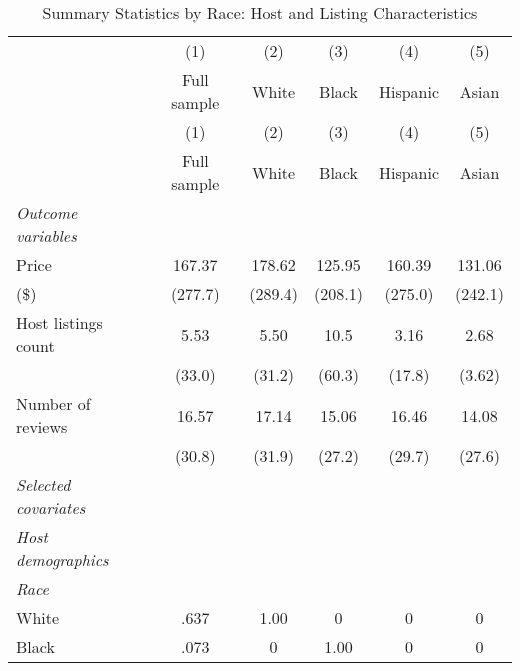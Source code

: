 {
\def\sym#1{\ifmmode^{#1}\else\(^{#1}\)\fi}
\begin{longtable}{l*{5}{c}}
\caption{Summary Statistics by Race: Host and Listing Characteristics}\\
\hline
                    &\multicolumn{1}{c}{(1)}&\multicolumn{1}{c}{(2)}&\multicolumn{1}{c}{(3)}&\multicolumn{1}{c}{(4)}&\multicolumn{1}{c}{(5)}\\
                    &\multicolumn{1}{c}{Full sample}&\multicolumn{1}{c}{White}&\multicolumn{1}{c}{Black}&\multicolumn{1}{c}{Hispanic}&\multicolumn{1}{c}{Asian}\\
\hline\hline\endfirsthead\hline\endhead\hline\endfoot\endlastfoot
                    &\multicolumn{1}{c}{(1)}&\multicolumn{1}{c}{(2)}&\multicolumn{1}{c}{(3)}&\multicolumn{1}{c}{(4)}&\multicolumn{1}{c}{(5)}\\
                    &\multicolumn{1}{c}{Full sample}&\multicolumn{1}{c}{White}&\multicolumn{1}{c}{Black}&\multicolumn{1}{c}{Hispanic}&\multicolumn{1}{c}{Asian}\\
\hline
\endhead                  
\textit{Outcome variables} \\
\hline
Price          &           167.37         &           178.62         &           125.95         &           160.39       &   131.06\\
(\$)                    &         (277.7)         &         (289.4)         &         (208.1)         &         (275.0)     & (242.1)    \\
[1em]
Host listings count          &      5.53&      5.50 &      10.5&    3.16 & 2.68\\
                    &     (33.0)         &     (31.2)         &     (60.3)         &     (17.8) & 	(3.62)         \\
[1em]
Number of reviews        &      16.57  &      17.14         &      15.06&      16.46 & 	14.08\\
                    &     (30.8)         &     (31.9)         &     (27.2)         &     (29.7)        & (27.6) \\
[1em]
\textit{Selected covariates} \\
\hline\hline
\textit{Host demographics} \\
\hline
\textit{Race} \\
White     &      .637         &       1.00         &      0         &      0 	& 		0         \\
Black     &      .073       &       0         &      1.00         &      0 	& 		0         \\

\end{longtable}}

